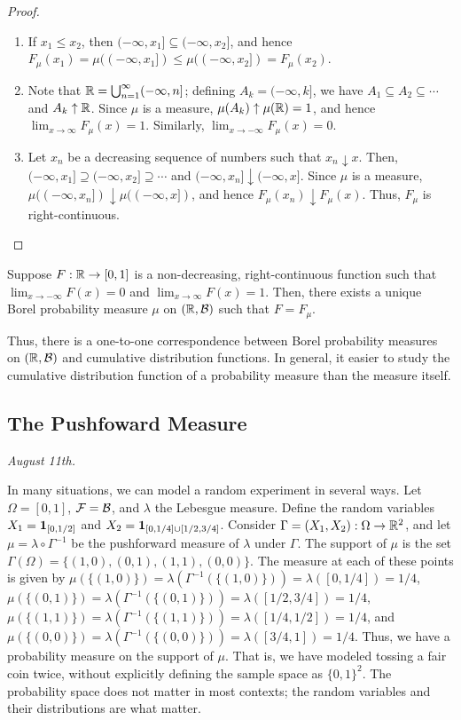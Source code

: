 \begin{proof}
    \begin{enumerate}
        \item If $x_{1} \leq x_{2}$, then $(-\infty,x_{1}] \subseteq (-\infty,x_{2}]$, and hence $F_{\mu}(x_{1}) = \mu((-\infty,x_{1}]) \leq \mu((-\infty,x_{2}]) = F_{\mu}(x_{2})$.
        \item Note that $\mathbb{R} = \bigcup_{n=1}^{\infty}(-\infty,n]$; defining $A_{k} = (-\infty,k]$, we have $A_{1} \subseteq A_{2} \subseteq \cdots$ and $A_{k} \uparrow \mathbb{R}$. Since $\mu$ is a measure, $\mu(A_{k}) \uparrow \mu(\mathbb{R}) = 1$, and hence $\lim_{x \to \infty} F_{\mu}(x) = 1$. Similarly, $\lim_{x \to -\infty} F_{\mu}(x) = 0$.
        \item Let $x_{n}$ be a decreasing sequence of numbers such that $x_{n} \downarrow x$. Then, $(-\infty,x_{1}] \supseteq (-\infty,x_{2}] \supseteq \cdots$ and $(-\infty,x_{n}] \downarrow (-\infty,x]$. Since $\mu$ is a measure, $\mu((-\infty,x_{n}]) \downarrow \mu((-\infty,x])$, and hence $F_{\mu}(x_{n}) \downarrow F_{\mu}(x)$. Thus, $F_{\mu}$ is right-continuous.
    \end{enumerate}
\end{proof}

\begin{theorem}
    Suppose $F:\mathbb{R} \to [0,1]$ is a non-decreasing, right-continuous function such that $\lim_{x \to -\infty} F(x) = 0$ and $\lim_{x \to \infty} F(x) = 1$. Then, there exists a unique Borel probability measure $\mu$ on $(\mathbb{R},\mathcal{B})$ such that $F = F_{\mu}$.
\end{theorem}
Thus, there is a one-to-one correspondence between Borel probability measures on $(\mathbb{R},\mathcal{B})$ and cumulative distribution functions. In general, it easier to study the cumulative distribution function of a probability measure than the measure itself.

\subsection{The Pushfoward Measure}
\textit{August 11th.}

In many situations, we can model a random experiment in several ways. Let $\Omega = [0,1]$, $\mathcal{F} = \mathcal{B}$, and $\lambda$ the Lebesgue measure. Define the random variables $X_{1} = \textbf{1}_{[0,1/2]}$ and $X_{2} = \textbf{1}_{[0,1/4] \cup [1/2,3/4]}$. Consider $\Gamma = (X_{1},X_{2}):\Omega \to \mathbb{R}^{2}$, and let $\mu = \lambda \circ \Gamma^{-1}$ be the pushforward measure of $\lambda$ under $\Gamma$. The support of $\mu$ is the set $\Gamma(\Omega) = \{(1,0),(0,1),(1,1),(0,0)\}$. The measure at each of these points is given by $\mu(\{(1,0)\}) = \lambda(\Gamma^{-1}(\{(1,0)\})) = \lambda([0,1/4]) = 1/4$, $\mu(\{(0,1)\}) = \lambda(\Gamma^{-1}(\{(0,1)\})) = \lambda([1/2,3/4]) = 1/4$, $\mu(\{(1,1)\}) = \lambda(\Gamma^{-1}(\{(1,1)\})) = \lambda([1/4,1/2]) = 1/4$, and $\mu(\{(0,0)\}) = \lambda(\Gamma^{-1}(\{(0,0)\})) = \lambda([3/4,1]) = 1/4$. Thus, we have a probability measure on the support of $\mu$. That is, we have modeled tossing a fair coin twice, without explicitly defining the sample space as $\{0,1\}^{2}$. The probability space does not matter in most contexts; the random variables and their distributions are what matter.

